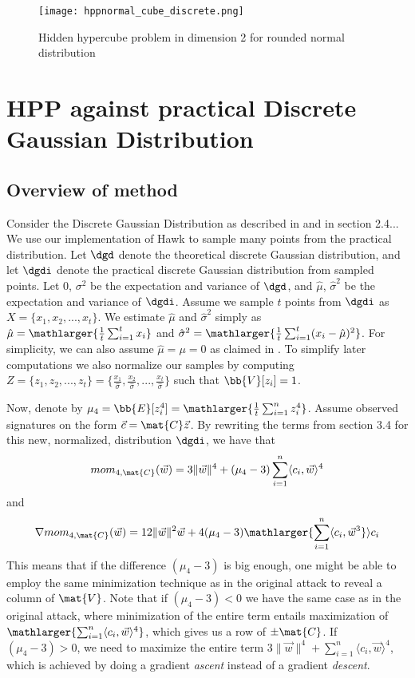 \begin{figure}[H]
    \centering
    \texttt{[image: hppnormal\_cube\_discrete.png]}
    \caption{Hidden hypercube problem in dimension 2 for rounded normal distribution}
  	\medskip 
\end{figure}
\section{HPP against practical Discrete Gaussian Distribution}
\subsection{Overview of method}
Consider the Discrete Gaussian Distribution as described in \cite{HawkSpec24} and in section 2.4... We use our implementation of Hawk to sample many points from the practical distribution.
Let $\dgd$ denote the theoretical discrete Gaussian distribution, and let $\dgdi$ denote the practical discrete Gaussian distribution from sampled points.
Let $0$, $\sigma^2$ be the expectation and variance of $\dgd$, and $\hat{\mu}$, $\hat{\sigma}^2$ be the expectation and variance of $\dgdi$.
Assume we sample $t$ points from $\dgdi$ as $X = \{x_1, x_2, ..., x_t\}$. We estimate $\hat{\mu}$ and $\hat{\sigma}^2$ simply as $\hat{\mu} = \mathlarger{\frac{1}{t} \sum_{i=1}^{t} x_i}$ and $\hat{\sigma}^2 = \mathlarger{\frac{1}{t} \sum_{i=1}^{t}(x_i - \hat{\mu})^2}$.
For simplicity, we can also assume $\hat{\mu} = \mu = 0$ as claimed in \cite{HawkSpec24}.
To simplify later computations we also normalize our samples by computing $Z = \{z_1, z_2, ..., z_t\} = \{\frac{x_1}{\hat{\sigma}}, \frac{x_2}{\hat{\sigma}},..., \frac{x_t}{\hat{\sigma}}\}$ such that 
$\bb{V}[z_i] = 1$.

Now, denote by $\mu_4 = \bb{E}[z_i^4] = \mathlarger{\frac{1}{t} \sum_{i=1}^{n} z_i ^4}$. Assume observed signatures on the form $\vec{c} = \mat{C} \vec{z}$. By rewriting the terms from section 3.4 for this new, normalized, distribution $\dgdi$, we have that
\[mom_{4, \mat{C}} (\vec{w}) = 3 \lVert \vec{w} \rVert ^4 + (\mu_4 - 3) \sum_{i=1}^{n} \langle c_i, \vec{w} \rangle^4 \]
and
\[\nabla mom_{4, \mat{C}} (\vec{w}) = 12 \lVert \vec{w} \rVert^2 \vec{w} + 4(\mu_4 - 3) \mathlarger{\sum_{i=1}^{n} \langle c_i, \vec{w}^3} \rangle c_i\]
This means that if the difference $(\mu_4 - 3)$ is big enough, one might be able to employ the same minimization technique as in the original attack to reveal a column of $\mat{V}$.
Note that if $(\mu_4 - 3) < 0$ we have the same case as in the original attack, where minimization of the entire term entails maximization of $\mathlarger{\sum_{i=1}^{n} \langle c_i, \vec{w} \rangle^4}$, which gives us a row of $\pm \mat{C}$.
If $(\mu_4 - 3) > 0$, we need to maximize the entire term $3 \lVert \vec{w} \rVert ^4 + \sum_{i=1}^{n} \langle c_i, \vec{w} \rangle^4$, which is achieved by doing a gradient \textit{ascent} instead of a gradient \textit{descent}.

